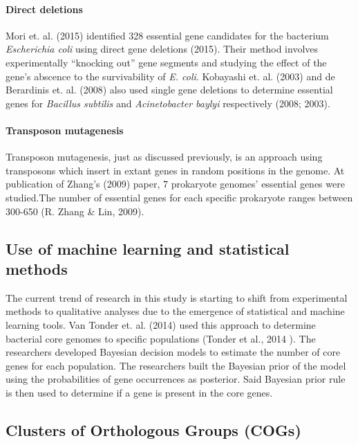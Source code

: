 \documentclass[]{report}
\begin{document}
\paragraph{Direct deletions}\label{direct-deletions}

Mori et. al. (2015) identified 328 essential gene candidates for the
bacterium \emph{Escherichia coli} using direct gene deletions (2015).
Their method involves experimentally ``knocking out'' gene segments and
studying the effect of the gene's abscence to the survivability of
\emph{E. coli}. Kobayashi et. al. (2003) and de Berardinis et. al.
(2008) also used single gene deletions to determine essential genes for
\emph{Bacillus subtilis} and \emph{Acinetobacter baylyi} respectively
(2008; 2003).

\paragraph{Transposon mutagenesis}\label{transposon-mutagenesis}

Transposon mutagenesis, just as discussed previously, is an approach
using transposons which insert in extant genes in random positions in
the genome. At publication of Zhang's (2009) paper, 7 prokaryote
genomes' essential genes were studied.The number of essential genes for
each specific prokaryote ranges between 300-650 (R. Zhang \& Lin, 2009).

\subsection{Use of machine learning and statistical
methods}\label{use-of-machine-learning-and-statistical-methods}

The current trend of research in this study is starting to shift from
experimental methods to qualitative analyses due to the emergence of
statistical and machine learning tools. Van Tonder et. al. (2014) used
this approach to determine bacterial core genomes to specific
populations (Tonder et al., 2014 ). The researchers developed Bayesian
decision models to estimate the number of core genes for each
population. The researchers built the Bayesian prior of the model using
the probabilities of gene occurrences as posterior. Said Bayesian prior
rule is then used to determine if a gene is present in the core genes.

\subsection{Clusters of Orthologous Groups
(COGs)}\label{clusters-of-orthologous-groups-cogs}
\end{document}
